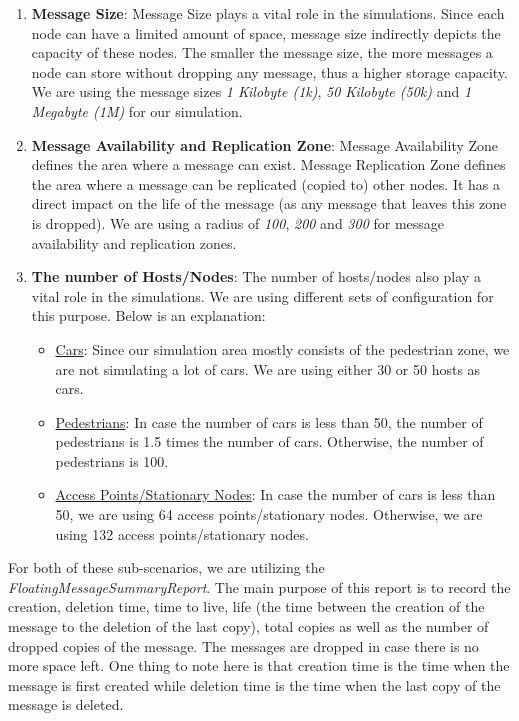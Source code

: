 \begin{enumerate}
	\item \textbf{Message Size}: Message Size plays a vital role in the simulations. Since each node can have a limited amount of space, message size indirectly depicts the capacity of these nodes. The smaller the message size, the more messages a node can store without dropping any message, thus a higher storage capacity. We are using the message sizes \textit{1 Kilobyte (1k)}, \textit{50 Kilobyte (50k)} and \textit{1 Megabyte (1M)} for our simulation.
	\item \textbf{Message Availability and Replication Zone}: Message Availability Zone defines the area where a message can exist. Message Replication Zone defines the area where a message can be replicated (copied to) other nodes. It has a direct impact on the life of the message (as any message that leaves this zone is dropped). We are using a radius of \textit{100}, \textit{200} and \textit{300} for message availability and replication zones.
	\item \textbf{The number of Hosts/Nodes}: The number of hosts/nodes also play a vital role in the simulations. We are using different sets of configuration for this purpose. Below is an explanation:
		\begin{itemize}
			\item \underline{Cars}: Since our simulation area mostly consists of the pedestrian zone, we are not simulating a lot of cars. We are using either 30 or 50 hosts as cars.
			\item \underline{Pedestrians}: In case the number of cars is less than 50, the number of pedestrians is 1.5 times the number of cars. Otherwise, the number of pedestrians is 100.
			\item \underline{Access Points/Stationary Nodes}: In case the number of cars is less than 50, we are using 64 access points/stationary nodes. Otherwise, we are using 132 access points/stationary nodes.
		\end{itemize}
\end{enumerate}

For both of these sub-scenarios, we are utilizing the \textit{FloatingMessageSummaryReport}. The main purpose of this report is to record the creation, deletion time, time to live, life (the time between the creation of the message to the deletion of the last copy), total copies as well as the number of dropped copies of the message. The messages are dropped in case there is no more space left. One thing to note here is that creation time is the time when the message is first created while deletion time is the time when the last copy of the message is deleted.


